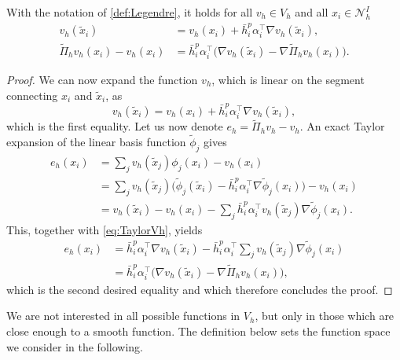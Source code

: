 \begin{lemma}\label{lem:InterpPreliminary} With the notation of \cref{def:Legendre}, it holds for all $v_h \in V_h$ and all $x_i \in \mathcal N_h^I$
	\begin{equation}
	\begin{aligned}
		v_h(\tilde x_i) &= v_h(x_i) + \bar h_i^p \alpha_i^\top \nabla v_h(\tilde x_i), \\
		\widetilde \Pi_h v_h(x_i) - v_h(x_i) &= \bar h_i^p \alpha_i^\top \Big(\nabla v_h(\tilde x_i) - \nabla \widetilde \Pi_h v_h(x_i)\Big).
	\end{aligned}
	\end{equation}
\end{lemma}
\begin{proof} We can now expand the function $v_h$, which is linear on the segment connecting $x_i$ and $\tilde x_i$, as
	\begin{equation}\label{eq:TaylorVh}
	v_h(\tilde x_i) = v_h(x_i) + \bar h_i^p \alpha_i^\top \nabla v_h(\tilde x_i),
	\end{equation}
	which is the first equality. Let us now denote $e_h = \widetilde \Pi_h v_h - v_h$. An exact Taylor expansion of the linear basis function $\tilde \phi_j$ gives
	\begin{equation}
	\begin{aligned}
	e_h(x_i) &= \sum_{j} v_h(\tilde x_j) \phi_j(x_i) - v_h(x_i) \\
	&= \sum_j v_h(\tilde x_j) \Big(\tilde \phi_j(\tilde x_i) - \bar h_i^p \alpha_i^\top \nabla \tilde \phi_j(x_i)\Big) - v_h(x_i) \\
	&= v_h(\tilde x_i) - v_h(x_i) - \sum_j \bar h_i^p \alpha_i^\top v_h(\tilde x_j) \nabla \tilde \phi_j(x_i).
	\end{aligned}
	\end{equation}
	This, together with \eqref{eq:TaylorVh}, yields
	\begin{equation}
	\begin{aligned}
	e_h(x_i) &= \bar h_i^p \alpha_i^\top \nabla v_h(\tilde x_i) - \bar h_i^p \alpha_i^\top \sum_j v_h(\tilde x_j) \nabla \tilde \phi_j(x_i) \\
	&= \bar h_i^p \alpha_i^\top \Big(\nabla v_h(\tilde x_i) - \nabla \widetilde \Pi_h v_h(x_i)\Big),
	\end{aligned}
	\end{equation}
	which is the second desired equality and which therefore concludes the proof.
\end{proof}


We are not interested in all possible functions in $V_h$, but only in those which are close enough to a smooth function. The definition below sets the function space we consider in the following.

